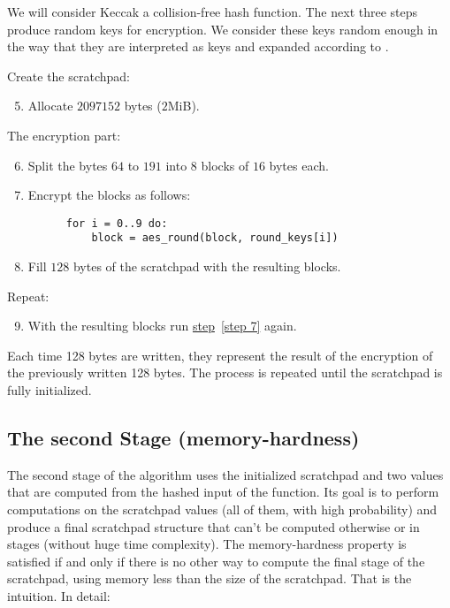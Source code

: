 We will consider Keccak a collision-free hash function. The next three steps produce random keys for encryption. We consider these keys random enough in the way that they are interpreted as keys and expanded according to \cite{nla.cat-vn4183631}.

\noindent Create the scratchpad:
\begin{enumerate}
  \setcounter{enumi}{4}
  \item Allocate $2097152$ bytes ($2$MiB).
\end{enumerate}
\noindent The encryption part:
\begin{enumerate}
  \setcounter{enumi}{5}
  \item Split the bytes $64$ to $191$ into $8$ blocks of $16$ bytes each.
  \item \label{step 7} Encrypt the blocks as follows:
    \begin{verbatim}
      for i = 0..9 do:
          block = aes_round(block, round_keys[i])
    \end{verbatim}
\end{enumerate}
\begin{enumerate}
  \setcounter{enumi}{7}
  \item Fill $128$ bytes of the scratchpad with the resulting blocks.
\end{enumerate}
\noindent Repeat:
\begin{enumerate}
  \setcounter{enumi}{8}
  \item With the resulting blocks run \hyperref[step 7]{step}~\ref{step 7} again.
\end{enumerate}
%
Each time 128 bytes are written, they represent the
result of the encryption of the previously written 128 bytes. The
process is repeated until the scratchpad is fully initialized.

\subsection{The second Stage (memory-hardness)}
The second stage of the algorithm uses the initialized scratchpad and two values that are computed from the hashed input of the function. Its goal is to perform computations on the scratchpad values (all of them, with high probability) and produce a final scratchpad structure that can't be computed otherwise or in stages (without huge time complexity). The memory-hardness property is satisfied if and only if there is no other way to compute the final stage of the scratchpad, using memory less than the size of the scratchpad. That is the intuition. In detail:

